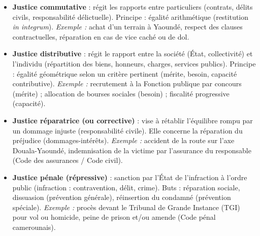 \documentclass[11pt]{article}
\begin{document}
\begin{propriete}
\begin{itemize}
  \item \textbf{Justice commutative} : régit les rapports entre particuliers (contrats, délits civils, responsabilité délictuelle). Principe : égalité arithmétique (restitution \emph{in integrum}). \textit{Exemple :} achat d'un terrain à Yaoundé, respect des clauses contractuelles, réparation en cas de vice caché ou de dol.
  \item \textbf{Justice distributive} : régit le rapport entre la société (État, collectivité) et l'individu (répartition des biens, honneurs, charges, services publics). Principe : égalité géométrique selon un critère pertinent (mérite, besoin, capacité contributive). \textit{Exemple :} recrutement à la Fonction publique par concours (mérite) ; allocation de bourses sociales (besoin) ; fiscalité progressive (capacité).
  \item \textbf{Justice réparatrice (ou corrective)} : vise à rétablir l'équilibre rompu par un dommage injuste (responsabilité civile). Elle concerne la réparation du préjudice (dommages-intérêts). \textit{Exemple :} accident de la route sur l'axe Douala-Yaoundé, indemnisation de la victime par l'assurance du responsable (Code des assurances / Code civil).
  \item \textbf{Justice pénale (répressive)} : sanction par l'État de l'infraction à l'ordre public (infraction : contravention, délit, crime). Buts : réparation sociale, dissuasion (prévention générale), réinsertion du condamné (prévention spéciale). \textit{Exemple :} procès devant le Tribunal de Grande Instance (TGI) pour vol ou homicide, peine de prison et/ou amende (Code pénal camerounais).
\end{itemize}
\end{propriete}
\end{document}
